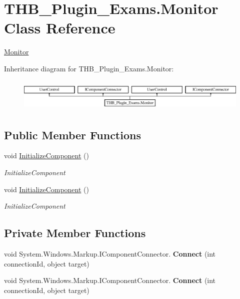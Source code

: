 \hypertarget{class_t_h_b___plugin___exams_1_1_monitor}{}\section{T\+H\+B\+\_\+\+Plugin\+\_\+\+Exams.\+Monitor Class Reference}
\label{class_t_h_b___plugin___exams_1_1_monitor}


\mbox{\hyperlink{class_t_h_b___plugin___exams_1_1_monitor}{Monitor}}  


Inheritance diagram for T\+H\+B\+\_\+\+Plugin\+\_\+\+Exams.\+Monitor\+:\begin{figure}[H]
\begin{center}
\leavevmode
\includegraphics[height=1.590909cm]{d9/d79/class_t_h_b___plugin___exams_1_1_monitor}
\end{center}
\end{figure}
\subsection*{Public Member Functions}
\begin{DoxyCompactItemize}
\item 
void \mbox{\hyperlink{class_t_h_b___plugin___exams_1_1_monitor_ae2ad56728566bc79087a4688e94db888}{Initialize\+Component}} ()
\begin{DoxyCompactList}\small\item\em Initialize\+Component \end{DoxyCompactList}\item 
void \mbox{\hyperlink{class_t_h_b___plugin___exams_1_1_monitor_ae2ad56728566bc79087a4688e94db888}{Initialize\+Component}} ()
\begin{DoxyCompactList}\small\item\em Initialize\+Component \end{DoxyCompactList}\end{DoxyCompactItemize}
\subsection*{Private Member Functions}
\begin{DoxyCompactItemize}
\item 
\mbox{\label{class_t_h_b___plugin___exams_1_1_monitor_acafc947f48f9dbde9c1b0d726aae5c1f}} 
void System.\+Windows.\+Markup.\+I\+Component\+Connector. {\bfseries Connect} (int connection\+Id, object target)
\item 
\mbox{\label{class_t_h_b___plugin___exams_1_1_monitor_acafc947f48f9dbde9c1b0d726aae5c1f}} 
void System.\+Windows.\+Markup.\+I\+Component\+Connector. {\bfseries Connect} (int connection\+Id, object target)
\end{DoxyCompactItemize}
